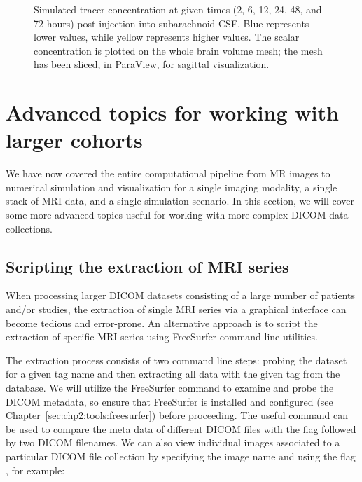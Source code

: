 \begin{figure}[h]
\begin{tabular}{l l l l}
    \end{tabular}
    \caption{Simulated tracer concentration at given times (2, 6, 12, 24, 48, 
	and 72 hours) post-injection into subarachnoid CSF. Blue 
	represents lower values, while yellow represents higher values.  
	The scalar concentration is plotted on the whole brain volume mesh; the 
	mesh has been sliced, in ParaView, for sagittal visualization.}
    \label{fig:chp3:approximate-numerical-soln}
\end{figure}

\section{Advanced topics for working with larger cohorts}
\label{sec:chp3:advanced}
We have now covered the entire computational pipeline from MR images
to numerical simulation and visualization for a single imaging
modality, a single stack of MRI data, and a single simulation scenario. In
this section, we will cover some more advanced topics useful for
working with more complex DICOM data collections.

\subsection{Scripting the extraction of MRI series}

When processing larger DICOM datasets consisting of a large number of
patients and/or studies, the extraction of single MRI series via a
graphical interface can become tedious and error-prone. An alternative
approach is to script the extraction of specific MRI series using
FreeSurfer command line utilities.

%
%
The extraction process consists of two command line steps: probing the
dataset for a given tag name and then extracting all data with the
given tag from the database. We will utilize the FreeSurfer command
 to examine and probe the DICOM metadata, so
ensure that FreeSurfer is installed and configured (see
Chapter~\ref{sec:chp2:tools:freesurfer}) before proceeding. The useful
command  can be used to compare the meta
data of different DICOM files with the flag  followed
by two DICOM filenames. We can also view individual images associated to 
a particular DICOM file collection by specifying the image name and using 
the flag , for example:

